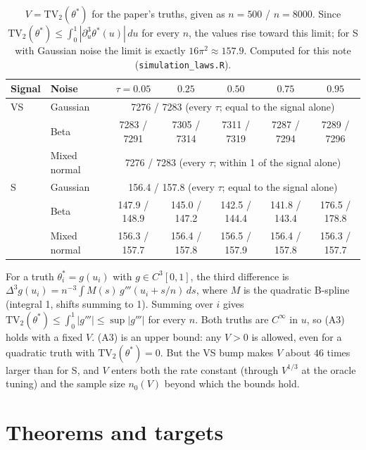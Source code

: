 \documentclass[11pt]{article}
\newcommand{\TV}{\mathrm{TV}}
\theoremstyle{plain}
\theoremstyle{definition}
\theoremstyle{remark}
\begin{document}
\begin{table}[h]
\centering\small
\caption{$V=\TV_2(\theta^*)$ for the paper's truths, given as $n=500$ / $n=8000$. Since $\TV_2(\theta^*)\le\int_0^1|\partial_u^3\theta^*(u)|\,du$ for every $n$, the values rise toward this limit; for S with Gaussian noise the limit is exactly $16\pi^2\approx157.9$. Computed for this note (\texttt{simulation\_laws.R}).}
\label{tab:simV}
\begin{tabular}{@{}llccccc@{}}
\toprule
Signal & Noise & $\tau=0.05$ & $0.25$ & $0.50$ & $0.75$ & $0.95$ \\
\midrule
VS & Gaussian & \multicolumn{5}{c}{7276 / 7283 (every $\tau$; equal to the signal alone)} \\
 & Beta & 7283 / 7291 & 7305 / 7314 & 7311 / 7319 & 7287 / 7294 & 7289 / 7296 \\
 & Mixed normal & \multicolumn{5}{c}{7276 / 7283 (every $\tau$; within 1 of the signal alone)} \\
\addlinespace
S & Gaussian & \multicolumn{5}{c}{156.4 / 157.8 (every $\tau$; equal to the signal alone)} \\
 & Beta & 147.9 / 148.9 & 145.0 / 147.2 & 142.5 / 144.4 & 141.8 / 143.4 & 176.5 / 178.8 \\
 & Mixed normal & 156.3 / 157.7 & 156.4 / 157.8 & 156.5 / 157.9 & 156.4 / 157.8 & 156.3 / 157.7 \\
\bottomrule
\end{tabular}
\end{table}

\noindent For a truth $\theta^*_i=g(u_i)$ with $g\in C^3[0,1]$, the third difference is $\Delta^3g(u_i)=n^{-3}\int M(s)\,g'''(u_i+s/n)\,ds$, where $M$ is the quadratic B-spline (integral 1, shifts summing to 1). Summing over $i$ gives $\TV_2(\theta^*)\le\int_0^1|g'''|\le\sup|g'''|$ for every $n$. Both truths are $C^\infty$ in $u$, so (A3) holds with a fixed $V$. (A3) is an upper bound: any $V>0$ is allowed, even for a quadratic truth with $\TV_2(\theta^*)=0$. But the VS bump makes $V$ about $46$ times larger than for S, and $V$ enters both the rate constant (through $V^{1/3}$ at the oracle tuning) and the sample size $n_0(V)$ beyond which the bounds hold.

\section{Theorems and targets}
\label{sec:theorems}
\end{document}
